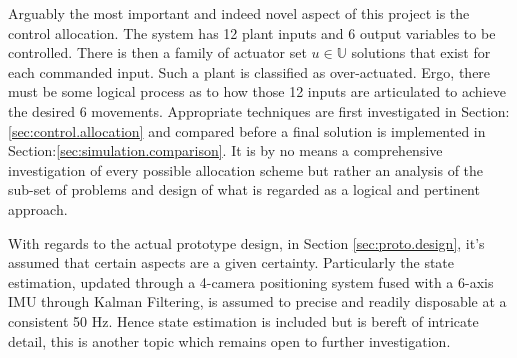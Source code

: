 \par
Arguably the most important and indeed novel aspect of this project is the control allocation. The system has 12 plant inputs and 6 output variables to be controlled. There is then a family of actuator set $u\in\mathbb{U}$ solutions that exist for each commanded input. Such a plant is classified as over-actuated. Ergo, there must be some logical process as to how those 12 inputs are articulated to achieve the desired 6 movements. Appropriate techniques are first investigated in Section:\ref{sec:control.allocation} and compared before a final solution is implemented in Section:\ref{sec:simulation.comparison}. It is by no means a comprehensive investigation of every possible allocation scheme but rather an analysis of the sub-set of problems and design of what is regarded as a logical and pertinent approach.
\par
With regards to the actual prototype design, in Section \ref{sec:proto.design}, it's assumed that certain aspects are a given certainty. Particularly the state estimation, updated through a 4-camera positioning system fused with a 6-axis IMU through Kalman Filtering, is assumed to precise and readily disposable at a consistent 50 Hz. Hence state estimation is included but is bereft of intricate detail, this is another topic which remains open to further investigation.
